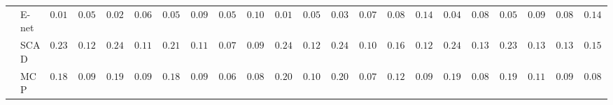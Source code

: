\begin{tabular}{ll|ll|llllll|llllll|llllll}
 & E-net  & $0.0167$ & $0.0556$ & $0.0250$ & $0.0686$ & $0.0550$ & $0.0978$ & $0.0533$ & $0.1056$ & $0.0183$ & $0.0575$ & $0.0333$ & $0.0749$ & $0.0883$ & $0.1411$ & $0.0400$ & $0.0825$ & $0.0533$ & $0.0973$ & $0.0817$ & $0.1451$ \\
 & SCAD  & $0.2367$ & $0.1235$ & $0.2450$ & $0.1147$ & $0.2167$ & $0.1124$ & $0.0700$ & $0.0923$ & $0.2417$ & $0.1217$ & $0.2433$ & $0.1070$ & $0.1683$ & $0.1242$ & $0.2433$ & $0.1390$ & $0.2367$ & $0.1323$ & $0.1333$ & $0.1517$ \\
 & MCP  & $0.1883$ & $0.0907$ & $0.1933$ & $0.0909$ & $0.1800$ & $0.0938$ & $0.0650$ & $0.0851$ & $0.2067$ & $0.1036$ & $0.2050$ & $0.0780$ & $0.1233$ & $0.0906$ & $0.1967$ & $0.0898$ & $0.1900$ & $0.1137$ & $0.0967$ & $0.0827$ \\
\hline 
\end{tabular}

